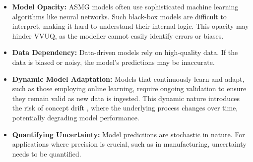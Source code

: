 \begin{itemize}
  \item \textbf{Model Opacity:} ASMG models often use sophisticated machine learning algorithms like neural networks. Such black-box models are difficult to interpret, making it hard to understand their internal logic. This opacity may hinder VVUQ, as the modeller cannot easily identify errors or biases.
  \item \textbf{Data Dependency:} Data-driven models rely on high-quality data. If the data is biased or noisy, the model's predictions may be inaccurate.
  \item \textbf{Dynamic Model Adaptation:} Models that continuously learn and adapt, such as those employing online learning, require ongoing validation to ensure they remain valid as new data is ingested. This dynamic nature introduces the risk of concept drift \autocite{lu2018learning}, where the underlying process changes over time, potentially degrading model performance.
  \item \textbf{Quantifying Uncertainty:} Model predictions are stochastic in nature. For applications where precision is crucial, such as in manufacturing, uncertainty needs to be quantified.
\end{itemize}

